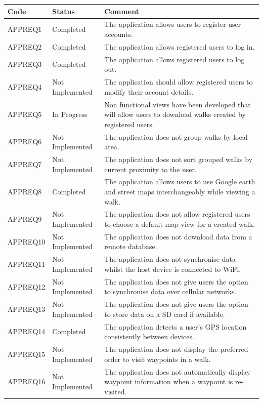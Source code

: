 \documentclass[11pt,a4paper]{article}
\begin{document}
\begin{longtable}{ p{}|p{}|p{} }
\textbf{Code} & \textbf{Status} & \textbf{Comment} \\
\hline
APPREQ1 & Completed & The application allows users to register user accounts. \\ \hline
APPREQ2 & Completed & The application allows registered users to log in. \\ \hline
APPREQ3 & Completed & The application allows registered users to log out. \\ \hline
APPREQ4 & Not Implemented & The application should allow registered users to modify their account details. \\ \hline
APPREQ5 & In Progress & Non functional views have been developed that will allow users to download walks created by registered users. \\ \hline
APPREQ6 & Not Implemented & The application does not group walks by local area. \\ \hline
APPREQ7 & Not Implemented & The application does not sort grouped walks by current proximity to the user. \\ \hline
APPREQ8 & Completed & The application allows users to use Google earth and street maps interchangeably while viewing a walk. \\ \hline
APPREQ9 & Not Implemented & The application does not allow registered users to choose a default map view for a created walk. \\ \hline
APPREQ10 & Not Implemented & The application does not download data from a remote database. \\ \hline
APPREQ11 & Not Implemented & The application does not synchronise data whilst the host device is connected to WiFi. \\ \hline
APPREQ12 & Not Implemented & The application does not give users the option to synchronise data over cellular networks. \\ \hline
APPREQ13 & Not Implemented & The application does not give users the option to store data on a SD card if available. \\ \hline
APPREQ14 & Completed &  The application detects a user's GPS location consistently between devices. \\ \hline
APPREQ15 & Not Implemented & The application does not display the preferred order to visit waypoints in a walk. \\ \hline
APPREQ16 & Not Implemented & The application does not automatically display waypoint information when a waypoint is re-visited. \\ \hline

\end{longtable}
\end{document}
